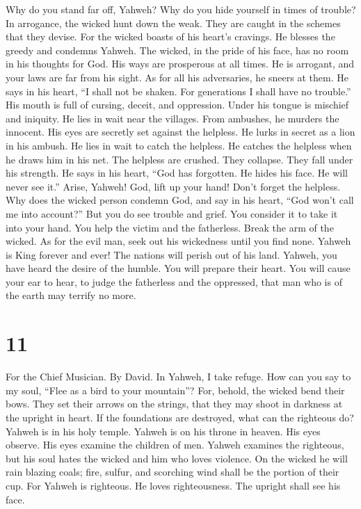  Why do you stand far off, Yahweh? Why do you hide
yourself in times of trouble?  In arrogance, the wicked
hunt down the weak. They are caught in the schemes that they devise.
 For the wicked boasts of his heart's cravings. He blesses
the greedy and condemns Yahweh.  The wicked, in the pride
of his face, has no room in his thoughts for God.  His
ways are prosperous at all times. He is arrogant, and your laws are far
from his sight. As for all his adversaries, he sneers at them.
 He says in his heart, ``I shall not be shaken. For
generations I shall have no trouble.''  His mouth is full
of cursing, deceit, and oppression. Under his tongue is mischief and
iniquity.  He lies in wait near the villages. From
ambushes, he murders the innocent. His eyes are secretly set against the
helpless.  He lurks in secret as a lion in his ambush. He
lies in wait to catch the helpless. He catches the helpless when he
draws him in his net.  The helpless are crushed. They
collapse. They fall under his strength.  He says in his
heart, ``God has forgotten. He hides his face. He will never see it.''
 Arise, Yahweh! God, lift up your hand! Don't forget the
helpless.  Why does the wicked person condemn God, and
say in his heart, ``God won't call me into account?'' 
But you do see trouble and grief. You consider it to take it into your
hand. You help the victim and the fatherless.  Break the
arm of the wicked. As for the evil man, seek out his wickedness until
you find none.  Yahweh is King forever and ever! The
nations will perish out of his land.  Yahweh, you have
heard the desire of the humble. You will prepare their heart. You will
cause your ear to hear,  to judge the fatherless and the
oppressed, that man who is of the earth may terrify no more.

\hypertarget{section-10}{%
\section{11}\label{section-10}}

For the Chief Musician. By David.  In Yahweh, I take
refuge. How can you say to my soul, ``Flee as a bird to your mountain''?
 For, behold, the wicked bend their bows. They set their
arrows on the strings, that they may shoot in darkness at the upright in
heart.  If the foundations are destroyed, what can the
righteous do?  Yahweh is in his holy temple. Yahweh is on
his throne in heaven. His eyes observe. His eyes examine the children of
men.  Yahweh examines the righteous, but his soul hates
the wicked and him who loves violence.  On the wicked he
will rain blazing coals; fire, sulfur, and scorching wind shall be the
portion of their cup.  For Yahweh is righteous. He loves
righteousness. The upright shall see his face.

